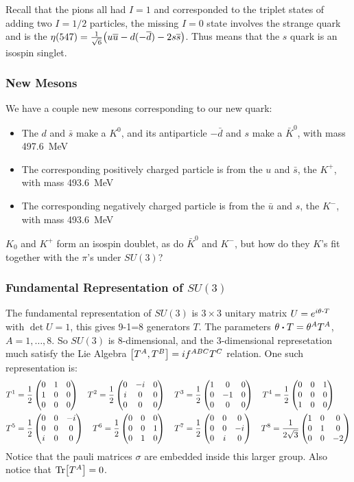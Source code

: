 Recall that the pions all had $I=1$ and corresponded to the triplet states of adding two $I=1/2$ particles, the missing $I=0$ state involves the strange quark and is the $\eta(547)=\frac1{\sqrt{6}}\qty(u\overline{u}-d(-\overline{d})-2s\overline{s})$. Thus means that the $s$ quark is an isospin singlet.

\subsubsection{New Mesons}
We have a couple new mesons corresponding to our new quark:
\begin{itemize}
\item The $d$ and $\bar{s}$ make a $K^0$, and its antiparticle $-\bar{d}$ and $s$ make a $\bar{K}^0$, with mass \SI{497.6}{\MeV}
\item The corresponding positively charged particle is from the $u$ and $\bar{s}$, the $K^+$, with mass \SI{493.6}{\MeV}
\item The corresponding negatively charged particle is from the $\bar{u}$ and $s$, the $K^-$, with mass \SI{493.6}{\MeV}
\end{itemize}
$K_0$ and $K^+$ form an isospin doublet, as do $\bar{K}^0$ and $K^-$, but how do they $K$'s fit together with the $\pi$'s under $SU(3)$?

\subsubsection{Fundamental Representation of $SU(3)$}
The fundamental representation of $SU(3)$ is $3\times3$ unitary matrix $U=e^{i\theta\vdot T}$ with $\det{U}=1$, this gives 9-1=8 generators $T$. The parameters $\theta\vdot T=\theta^AT^A$, $A=1,\dots,8$. So $SU(3)$ is 8-dimensional, and the 3-dimensional represetation much satisfy the Lie Algebra $\comm{T^A}{T^B}=if^{ABC}T^C$ relation. One such representation is:
\begin{align*}
  T^1&=\frac12\pmqty{0&1&0\\1&0&0\\0&0&0}\quad
  T^2=\frac12\pmqty{0&-i&0\\i&0&0\\0&0&0}\quad
  T^3=\frac12\pmqty{1&0&0\\0&-1&0\\0&0&0}\quad
  T^4=\frac12\pmqty{0&0&1\\0&0&0\\1&0&0}\\
  T^5&=\frac12\pmqty{0&0&-i\\0&0&0\\i&0&0}\quad
  T^6=\frac12\pmqty{0&0&0\\0&0&1\\0&1&0}\quad
  T^7=\frac12\pmqty{0&0&0\\0&0&-i\\0&i&0}\quad
  T^8=\frac1{2\sqrt{3}}\pmqty{1&0&0\\0&1&0\\0&0&-2}
\end{align*}
Notice that the pauli matrices $\sigma$ are embedded inside this larger group. Also notice that $\Tr[T^A]=0$.

